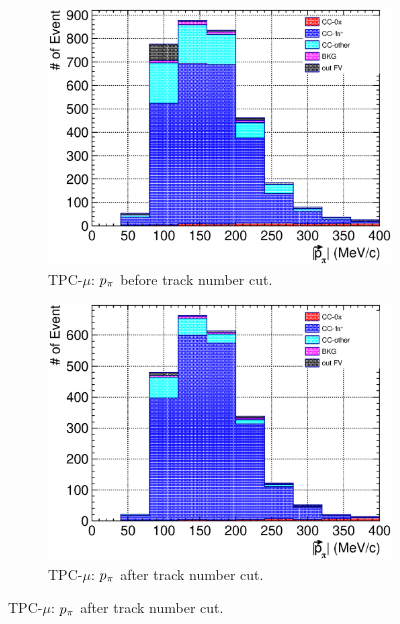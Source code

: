           \begin{figure}[ht]
             \centering
             \begin{subfigure}{\dbfigwid\textwidth}
                  \includegraphics[width=\textwidth]{figures/sel/TPCmu_p_pi_stack_al8.eps}
                  \caption{TPC-$\mu$: $p_{\pi}$ before track number cut.}
                  \label{subfig:tlpi-ppi-bf-trknumcut-tpc}
             \end{subfigure}
             \begin{subfigure}{\dbfigwid\textwidth}
                  \includegraphics[width=\textwidth]{figures/sel/TPCmu_p_pi_stack_al9.eps}
                  \caption{TPC-$\mu$: $p_{\pi}$ after track number cut.}
                  \label{subfig:tlpi-ppi-af-trknumcut-tpc}

\end{subfigure}
\end{figure}
